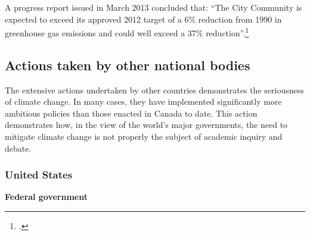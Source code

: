 A progress report issued in March 2013 concluded that: ``The City Community is expected to exceed its approved 2012 target of a 6\% reduction from 1990 in greenhouse gas emissions and could well exceed a 37\% reduction''.\footcite[][p. 15]{Toronto2013GHGmemo}






		\subsection{Actions taken by other national bodies}
		
		
		
The extensive actions undertaken by other countries demonstrates the seriousness of climate change.
In many cases, they have implemented significantly more ambitious policies than those enacted in Canada to date.
This action demonstrates how, in the view of the world's major governments, the need to mitigate climate change is not properly the subject of academic inquiry and debate.


		
		\subsubsection{United States}
		
		
		
\textbf{Federal government}


